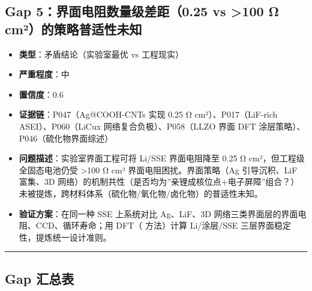 \documentclass[12pt,a4paper]{ctexart}
\providecommand{\tightlist}{%
  \setlength{\itemsep}{0pt}\setlength{\parskip}{0pt}}
\begin{document}
\subsection{Gap 5：界面电阻数量级差距（0.25 vs \textgreater100 Ω cm²）的策略普适性未知}\label{gap:gap-5ux754cux9762ux7535ux963bux6570ux91cfux7ea7ux5deeux8ddd0.25-vs-100-ux3c9-cmuxb2ux7684ux7b56ux7565ux666eux9002ux6027ux672aux77e5}

\begin{itemize}
\tightlist
\item
  \textbf{类型}：矛盾结论（实验室最优 vs 工程现实）
\item
  \textbf{严重程度}：中
\item
  \textbf{置信度}：0.6
\item
  \textbf{证据链}：P047（Ag@COOH-CNTs 实现 0.25 Ω cm²）、P017（LiF-rich ASEI）、P060（LiCux 网络复合负极）、P058（LLZO 界面 DFT 涂层策略）、P046（硫化物界面综述）
\item
  \textbf{问题描述}：实验室界面工程可将 Li/SSE 界面电阻降至 0.25 Ω cm²，但工程级全固态电池仍受 \textgreater100 Ω cm² 界面电阻困扰。界面策略（Ag 引导沉积、LiF 富集、3D 网络）的机制共性（是否均为''亲锂成核位点+电子屏障''组合？）未被提炼，跨材料体系（硫化物/氧化物/卤化物）的普适性未知。
\item
  \textbf{验证方案}：在同一种 SSE 上系统对比 Ag、LiF、3D 网络三类界面层的界面电阻、CCD、循环寿命；用 DFT（\cite{P058} 方法）计算 Li/涂层/SSE 三层界面稳定性，提炼统一设计准则。
\end{itemize}

\begin{center}\rule{0.5\linewidth}{0.5pt}\end{center}

\subsection{Gap 汇总表}\label{gap:gap-ux6c47ux603bux8868}
\end{document}
